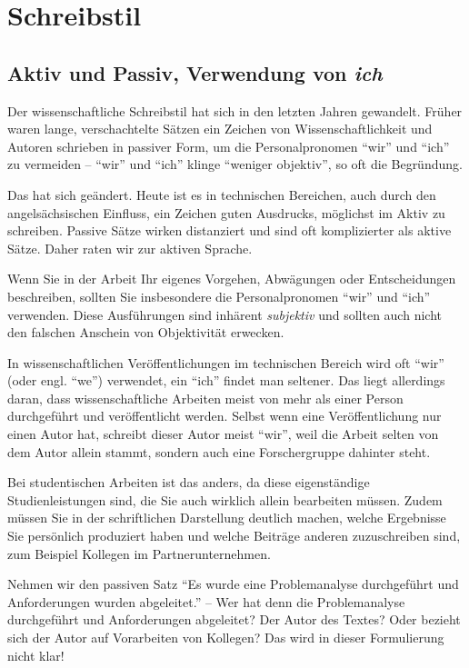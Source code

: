 \section{Schreibstil}

\subsection{Aktiv und Passiv, Verwendung von \textit{ich}}

Der wissenschaftliche Schreibstil hat sich in den letzten Jahren gewandelt. Früher waren lange, verschachtelte Sätzen ein Zeichen von Wissenschaftlichkeit und Autoren schrieben in passiver Form, um die Personalpronomen \enquote{wir} und \enquote{ich} zu vermeiden -- \enquote{wir} und \enquote{ich} klinge \enquote{weniger objektiv}, so oft die Begründung.

Das hat sich geändert. Heute ist es in technischen Bereichen, auch durch den angelsächsischen Einfluss, ein Zeichen guten Ausdrucks, möglichst im Aktiv zu schreiben. Passive Sätze wirken distanziert und sind oft komplizierter als aktive Sätze. Daher raten wir zur aktiven Sprache. 

Wenn Sie in der Arbeit Ihr eigenes Vorgehen, Abwägungen oder Entscheidungen beschreiben, sollten Sie insbesondere die Personalpronomen \enquote{wir} und \enquote{ich} verwenden. Diese Ausführungen sind inhärent \textit{subjektiv} und sollten auch nicht den falschen Anschein von Objektivität erwecken.

In wissenschaftlichen Veröffentlichungen im technischen Bereich wird oft \enquote{wir} (oder engl. \enquote{we}) verwendet, ein \enquote{ich} findet man seltener. Das liegt allerdings daran, dass wissenschaftliche Arbeiten meist von mehr als einer Person durchgeführt und veröffentlicht werden. Selbst wenn eine Veröffentlichung nur einen Autor hat, schreibt dieser Autor meist \enquote{wir}, weil die Arbeit selten von dem Autor allein stammt, sondern auch eine Forschergruppe dahinter steht.

Bei studentischen Arbeiten ist das anders, da diese eigenständige Studienleistungen sind, die Sie auch wirklich allein bearbeiten müssen. Zudem müssen Sie in der schriftlichen Darstellung deutlich machen, welche Ergebnisse Sie persönlich produziert haben und welche Beiträge anderen zuzuschreiben sind, zum Beispiel Kollegen im Partnerunternehmen.

Nehmen wir den passiven Satz \enquote{Es wurde eine Problemanalyse durchgeführt und Anforderungen wurden abgeleitet.} -- Wer hat denn die Problemanalyse durchgeführt und Anforderungen abgeleitet? Der Autor des Textes? Oder bezieht sich der Autor auf Vorarbeiten von Kollegen? Das wird in dieser Formulierung nicht klar! 

